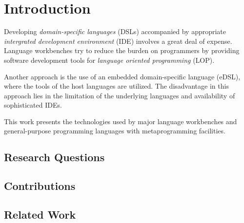 \chapter{Introduction}

Developing \textit{domain-specific languages} (DSLs) accompanied by appropriate \textit{intergrated development environment} (IDE) involves a great deal of expense.
Language workbenches try to reduce the burden on programmers by providing software development tools for \textit{language oriented programming} (LOP).

Another approach is the use of an embedded domain-specific language (eDSL), where the tools of the host languages are utilized.
The disadvantage in this approach lies in the limitation of the underlying languages and availability of sophisticated IDEs.

This work presents the technologies used by major language workbenches and general-purpose programming languages with metaprogramming facilities.


\section{Research Questions}

\section{Contributions}

\section{Related Work}


